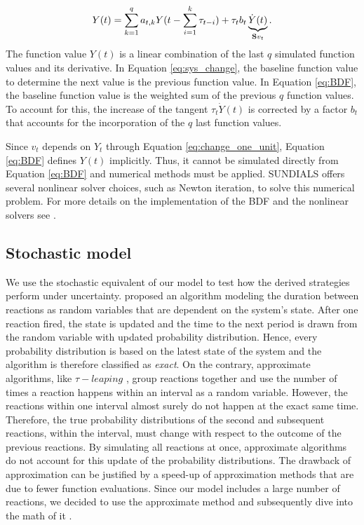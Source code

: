 \begin{align}
\label{eq:BDF}
Y(t) = \sum_{k=1}^q a_{t,k} Y(t - \sum_{i=1}^k \tau_{t-i} ) + \tau_t b_t \underbrace{\dot{Y}(t)}_{\mathbf{S} v_t}.
\end{align}
The function value $Y(t)$ is a linear combination of the last $q$ simulated function values and its derivative. In Equation \eqref{eq:sys_change}, the baseline function value to determine the next value is the previous function value. In Equation \eqref{eq:BDF}, the baseline function value is the weighted sum of the previous $q$ function values. To account for this, the increase of the tangent $\tau_t \dot{Y}(t)$ is corrected by a factor $b_t$ that accounts for the incorporation of the $q$ last function values.

Since $v_t$ depends on $Y_t$ through Equation \eqref{eq:change_one_unit}, Equation \eqref{eq:BDF} defines $Y(t)$ implicitly. Thus, it cannot be simulated directly from Equation \eqref{eq:BDF} and numerical methods must be applied. SUNDIALS offers several nonlinear solver choices, such as Newton iteration, to solve this numerical problem. For more details on the implementation of the BDF and the nonlinear solvers see \cite{Hindmarsh.2019}.
 
\subsection{Stochastic model}
\label{sec:stochastic}
We use the stochastic equivalent of our model to test how the derived strategies perform under uncertainty. \cite{Gillespie.1977} proposed an algorithm modeling the duration between reactions as random variables that are dependent on the system's state. After one reaction fired, the state is updated and the time to the next period is drawn from the random variable with updated probability distribution. Hence, every probability distribution is based on the latest state of the system and the algorithm is therefore classified as \textit{exact}.  
On the contrary, approximate algorithms, like $\tau-leaping$ \citep{Gillespie.2001}, group reactions together and use the number of times a reaction happens within an interval as a random variable. However, the reactions within one interval almost surely do not happen at the exact same time. Therefore, the true probability distributions of the second and subsequent reactions, within the interval, must change with respect to the outcome of the previous reactions. By simulating all reactions at once, approximate algorithms do not account for this update of the probability distributions. 
The drawback of approximation can be justified by a speed-up of approximation methods that are due to fewer function evaluations. Since our model includes a large number of reactions, we decided to use the approximate method and subsequently dive into the math of it \citep{Gillespie.2001}.\\

